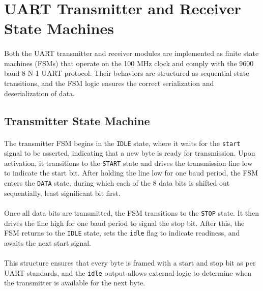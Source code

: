 \documentclass[12pt]{report}
\begin{document}
\section{UART Transmitter and Receiver State Machines}

\paragraph{}
Both the UART transmitter and receiver modules are implemented as finite state machines (FSMs) that operate on the 100 MHz clock and comply with the 9600 baud 8-N-1 UART protocol. Their behaviors are structured as sequential state transitions, and the FSM logic ensures the correct serialization and deserialization of data.

\subsection{Transmitter State Machine}

\paragraph{}
The transmitter FSM begins in the \texttt{IDLE} state, where it waits for the \texttt{start} signal to be asserted, indicating that a new byte is ready for transmission. Upon activation, it transitions to the \texttt{START} state and drives the transmission line low to indicate the start bit. After holding the line low for one baud period, the FSM enters the \texttt{DATA} state, during which each of the 8 data bits is shifted out sequentially, least significant bit first.

\paragraph{}
Once all data bits are transmitted, the FSM transitions to the \texttt{STOP} state. It then drives the line high for one baud period to signal the stop bit. After this, the FSM returns to the \texttt{IDLE} state, sets the \texttt{idle} flag to indicate readiness, and awaits the next start signal.

\paragraph{}
This structure ensures that every byte is framed with a start and stop bit as per UART standards, and the \texttt{idle} output allows external logic to determine when the transmitter is available for the next byte.
\end{document}
